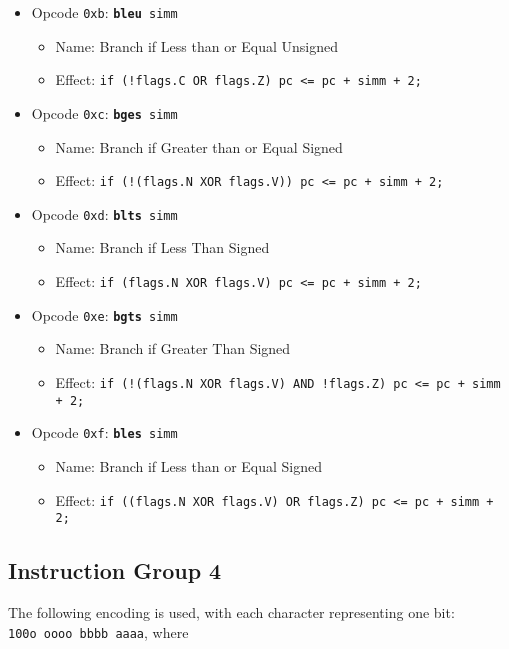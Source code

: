 \documentclass{article}
\begin{document}
\begin{itemize}
	\item Opcode \texttt{0xb}:
		\texttt{\textbf{bleu} simm}
		\begin{itemize}
		\item Name: Branch if Less than or Equal Unsigned
		\item Effect:
			\texttt{if (!flags.C OR flags.Z) pc <= pc + simm + 2;}
		\end{itemize}

	\item Opcode \texttt{0xc}:
		\texttt{\textbf{bges} simm}
		\begin{itemize}
		\item Name: Branch if Greater than or Equal Signed
		\item Effect:
			\texttt{if (!(flags.N XOR flags.V)) pc <= pc + simm + 2;}
		\end{itemize}

	\item Opcode \texttt{0xd}:
		\texttt{\textbf{blts} simm}
		\begin{itemize}
		\item Name: Branch if Less Than Signed
		\item Effect:
			\texttt{if (flags.N XOR flags.V) pc <= pc + simm + 2;}
		\end{itemize}

	\item Opcode \texttt{0xe}:
		\texttt{\textbf{bgts} simm}
		\begin{itemize}
		\item Name: Branch if Greater Than Signed
		\item Effect:
			\texttt{if (!(flags.N XOR flags.V) AND !flags.Z)
				pc <= pc + simm + 2;}
		\end{itemize}

	\item Opcode \texttt{0xf}:
		\texttt{\textbf{bles} simm}
		\begin{itemize}
		\item Name: Branch if Less than or Equal Signed
		\item Effect:
			\texttt{if ((flags.N XOR flags.V) OR flags.Z)
				pc <= pc + simm + 2;}
		\end{itemize}
	\end{itemize}

	\doublespacing
	\subsection{Instruction Group 4}
	The following encoding is used, with each character representing one
	bit: \\
	\texttt{100o oooo bbbb aaaa}, where
\end{document}
